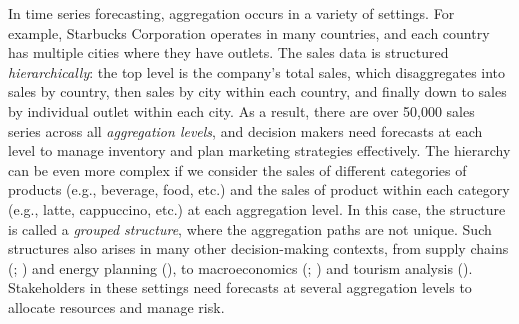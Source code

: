 \documentclass[
  11pt,
  letterpaper,
  DIV=11,
  numbers=noendperiod,
  titlepage]{scrartcl}
\begin{document}
In time series forecasting, aggregation occurs in a variety of settings.
For example, Starbucks Corporation operates in many countries, and each
country has multiple cities where they have outlets. The sales data is
structured \emph{hierarchically}: the top level is the company's total
sales, which disaggregates into sales by country, then sales by city
within each country, and finally down to sales by individual outlet
within each city. As a result, there are over 50,000 sales series across
all \emph{aggregation levels}, and decision makers need forecasts at
each level to manage inventory and plan marketing strategies
effectively. The hierarchy can be even more complex if we consider the
sales of different categories of products (e.g., beverage, food, etc.)
and the sales of product within each category (e.g., latte, cappuccino,
etc.) at each aggregation level. In this case, the structure is called a
\emph{grouped structure}, where the aggregation paths are not unique.
Such structures also arises in many other decision-making contexts, from
supply chains (;
) and energy
planning (), to
macroeconomics (; ) and tourism analysis
().
Stakeholders in these settings need forecasts at several aggregation
levels to allocate resources and manage risk.
\end{document}
